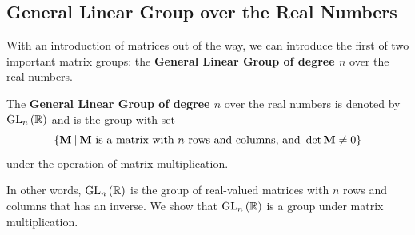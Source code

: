 \subsection{General Linear Group over the Real Numbers}
With an introduction of matrices out of the way, we can introduce the first of two important matrix groups: the \textbf{General Linear Group of degree $n$} over the real numbers.
\begin{definition}
    The \textbf{General Linear Group of degree $n$} over the real numbers is denoted by $\mathrm{GL}_{n}\left(\mathbb{R}\right)$ and is the group with set
    \[
        \left\{\textbf{M} \vert \text{\textbf{M} is a matrix with } n \text{ rows and columns, and } \det \textbf{M} \neq 0\right\}
    \]
    under the operation of matrix multiplication.
\end{definition}
In other words, $\mathrm{GL}_{n}\left(\mathbb{R}\right)$ is the group of real-valued matrices with $n$ rows and columns that has an inverse. We show that $\mathrm{GL}_{n}\left(\mathbb{R}\right)$ is a group under matrix multiplication.
